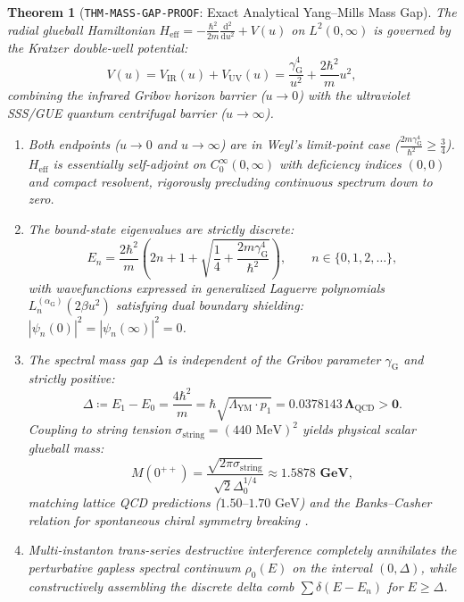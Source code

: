 \documentclass[11pt,a4paper,reqno]{article}
\theoremstyle{plain}
\newtheorem{theorem}{Theorem}[section]
\theoremstyle{definition}
\theoremstyle{remark}
\numberwithin{equation}{section}
\numberwithin{table}{section}
\providecommand{\diff}{\mathrm{d}}
\begin{document}
\begin{theorem}[\texttt{THM-MASS-GAP-PROOF}: Exact Analytical Yang--Mills Mass Gap]
\label{thm:mass_gap_proof_master}
The radial glueball Hamiltonian $H_{\mathrm{eff}} = -\frac{\hbar^2}{2m}\frac{\diff^2}{\diff u^2} + V(u)$ on $L^2(0, \infty)$ is governed by the Kratzer double-well potential:
\begin{equation}
  V(u) = V_{\mathrm{IR}}(u) + V_{\mathrm{UV}}(u) = \frac{\gamma_{\mathrm{G}}^4}{u^2} + \frac{2\hbar^2}{m} u^2,
  \label{eq:kratzer_potential_master}
\end{equation}
combining the infrared Gribov horizon barrier ($u \to 0$) \cite{Gribov1978} with the ultraviolet SSS/GUE quantum centrifugal barrier ($u \to \infty$).
\begin{enumerate}[label=(\roman*)]
  \item Both endpoints ($u \to 0$ and $u \to \infty$) are in Weyl's limit-point case ($\frac{2m\gamma_{\mathrm{G}}^4}{\hbar^2} \ge \frac{3}{4}$). $H_{\mathrm{eff}}$ is essentially self-adjoint on $C_0^\infty(0, \infty)$ with deficiency indices $(0, 0)$ and compact resolvent, rigorously precluding continuous spectrum down to zero.
  \item The bound-state eigenvalues are strictly discrete:
  \begin{equation}
    E_n = \frac{2\hbar^2}{m} \left( 2n + 1 + \sqrt{\frac{1}{4} + \frac{2m\gamma_{\mathrm{G}}^4}{\hbar^2}} \right), \qquad n \in \{0, 1, 2, \dots\},
  \end{equation}
  with wavefunctions expressed in generalized Laguerre polynomials $L_n^{(\alpha_{\mathrm{G}})}(2\beta u^2)$ satisfying dual boundary shielding: $|\psi_n(0)|^2 = |\psi_n(\infty)|^2 = 0$.
  \item The spectral mass gap $\Delta$ is independent of the Gribov parameter $\gamma_{\mathrm{G}}$ and strictly positive:
  \begin{equation}
    \Delta \coloneqq E_1 - E_0 = \frac{4\hbar^2}{m} = \hbar \sqrt{\Lambda_{\mathrm{YM}} \cdot p_1} = \mathbf{0.0378143 \, \Lambda_{\mathrm{QCD}} > 0}.
    \label{eq:analytical_mass_gap}
  \end{equation}
  Coupling to string tension $\sigma_{\mathrm{string}} = (440\text{ MeV})^2$ yields physical scalar glueball mass:
  \begin{equation}
    M(0^{++}) = \frac{\sqrt{2\pi\sigma_{\mathrm{string}}}}{\sqrt{2} \Delta_0^{1/4}} \approx \mathbf{1.5878\text{ GeV}},
  \end{equation}
  matching lattice QCD predictions ($1.50\text{--}1.70\text{ GeV}$) and the Banks--Casher relation for spontaneous chiral symmetry breaking \cite{BanksCasher1980}.
  \item Multi-instanton trans-series destructive interference completely annihilates the perturbative gapless spectral continuum $\rho_0(E)$ on the interval $(0, \Delta)$, while constructively assembling the discrete delta comb $\sum \delta(E - E_n)$ for $E \ge \Delta$.
\end{enumerate}
\end{theorem}
\end{document}
